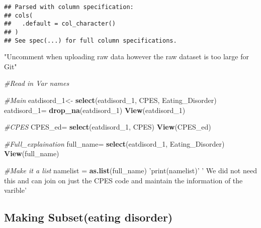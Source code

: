 \documentclass[]{article}
\newenvironment{Shaded}{\begin{snugshade}}{\end{snugshade}}
\newcommand{\KeywordTok}[1]{\textcolor[rgb]{0.13,0.29,0.53}{\textbf{#1}}}
\newcommand{\DecValTok}[1]{\textcolor[rgb]{0.00,0.00,0.81}{#1}}
\newcommand{\StringTok}[1]{\textcolor[rgb]{0.31,0.60,0.02}{#1}}
\newcommand{\CommentTok}[1]{\textcolor[rgb]{0.56,0.35,0.01}{\textit{#1}}}
\newcommand{\OperatorTok}[1]{\textcolor[rgb]{0.81,0.36,0.00}{\textbf{#1}}}
\newcommand{\NormalTok}[1]{#1}
\begin{document}
\begin{verbatim}
## Parsed with column specification:
## cols(
##   .default = col_character()
## )
## See spec(...) for full column specifications.
\end{verbatim}

\begin{Shaded}
\begin{Highlighting}[]
\StringTok{"Uncomment when uploading raw data however the raw dataset is too large for Git"}
\end{Highlighting}
\end{Shaded}

\begin{Shaded}
\begin{Highlighting}[]
\CommentTok{#Read in Var names}

\CommentTok{#Main}
\NormalTok{eatdisord_}\DecValTok{1}\NormalTok{<-}\StringTok{ }\KeywordTok{select}\NormalTok{(eatdisord_}\DecValTok{1}\NormalTok{, CPES, Eating_Disorder)}
\NormalTok{eatdisord_}\DecValTok{1}\NormalTok{=}\StringTok{ }\KeywordTok{drop_na}\NormalTok{(eatdisord_}\DecValTok{1}\NormalTok{)}
\KeywordTok{View}\NormalTok{(eatdisord_}\DecValTok{1}\NormalTok{)}

\CommentTok{#CPES}
\NormalTok{CPES_ed=}\StringTok{ }\KeywordTok{select}\NormalTok{(eatdisord_}\DecValTok{1}\NormalTok{, CPES)}
\KeywordTok{View}\NormalTok{(CPES_ed)}

\CommentTok{#Full_explaination}
\NormalTok{full_name=}\StringTok{ }\KeywordTok{select}\NormalTok{(eatdisord_}\DecValTok{1}\NormalTok{, Eating_Disorder)}
\KeywordTok{View}\NormalTok{(full_name)}

\CommentTok{#Make it a list}
\NormalTok{namelist =}\StringTok{ }\KeywordTok{as.list}\NormalTok{(full_name)}
\StringTok{'print(namelist)'}
\StringTok{' We did not need this and can join on just the CPES code and maintain the information of the varible'}
\end{Highlighting}
\end{Shaded}

\subsection{Making Subset(eating
disorder)}\label{making-subseteating-disorder}

\begin{Shaded}
\end{Shaded}
\end{document}
